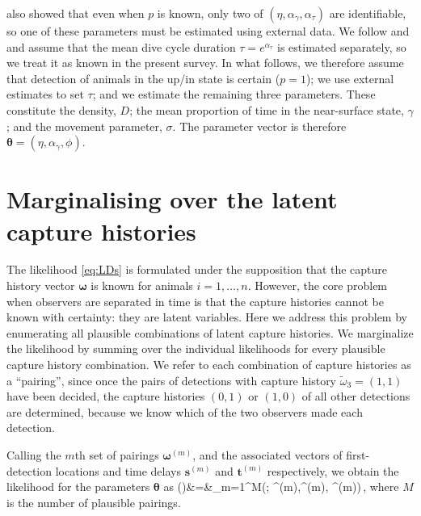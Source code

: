 \documentclass[useAMS, usenatbib, referee]{biom}\usepackage[]{graphicx}\usepackage[]{color}
\newcommand{\dotomega}{\tilde{\omega}}
\begin{document}
\cite{Stevenson+al:19} also showed that even when $p$ is known, only two of $(\eta,\alpha_\gamma,\alpha_\tau)$ are identifiable, so one of these parameters must be estimated using external data. We follow \cite{Stevenson+al:19} and \cite{Hiby+Lovell:98} and assume that the mean dive cycle duration $\tau=e^{\alpha_\tau}$ is estimated separately, so we treat it as known in the present survey. In what follows, we therefore assume that detection of animals in the up/in state is certain ($p=1$); we use external estimates to set $\tau$; and we estimate the remaining three parameters. These constitute the density, $D$; the mean proportion of time in the near-surface state, $\gamma$; and the movement parameter, $\sigma$. The parameter vector is therefore $\bm{\theta}=(\eta,\alpha_\gamma, \phi)$.



\section{Marginalising over the latent capture histories}

The likelihood \eqref{eq:LDs} %
is formulated under the supposition that the capture history vector $\bm{\omega}$ is known for animals $i=1, \ldots, n$. However, the core problem when observers are separated in time is that the capture histories cannot be known with certainty: they are latent variables. Here we address this problem by enumerating all plausible combinations of latent capture histories. We marginalize the likelihood by summing over the individual likelihoods for every plausible capture history combination. We refer to each combination of capture histories as a ``pairing'', since once the pairs of detections with capture history $\dotomega_3=(1,1)$ have been decided, the capture histories $(0, 1)$ or $(1, 0)$ of all other detections are determined, because we know which of the two observers made each detection.

Calling the $m$th set of pairings $\bm{\omega}^{(m)}$, and the associated vectors of first-detection locations and time delays  $\bm{s}^{(m)}$ and $\bm{t}^{(m)}$ respectively, we obtain the likelihood for the parameters $\bm{\theta}$ as
\be
{}(\bm{\theta})&=&\sum_{m=1}^M\left(\bm{\theta}; ^{(m)},\bm{\omega}^{(m)}, ^{(m)}\right)\,,
\ee
\noindent
where $M$ is the number of plausible pairings.
\end{document}
